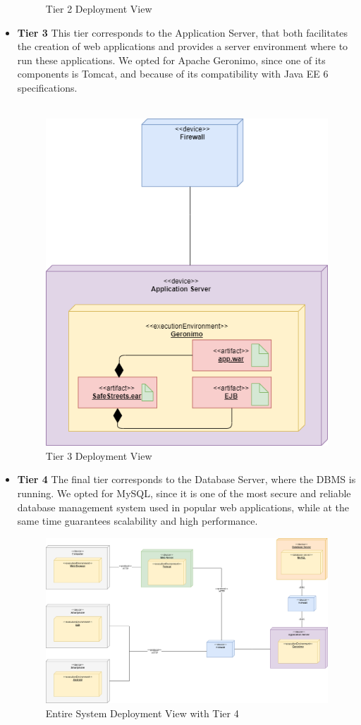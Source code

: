 \documentclass[12pt,a4paper]{article}
\begin{document}
\begin{itemize}
\begin{figure}[H]
		\caption{Tier 2 Deployment View}
	\end{figure}
\newpage
\item \textbf{Tier 3}
This tier corresponds to the Application Server, that both facilitates the creation of web applications and provides a server environment where to run these applications. We opted for Apache Geronimo, since one of its components is Tomcat, and because of its compatibility with Java EE 6 specifications.\\\\
\begin{figure}[H]
		\centering
		\includegraphics[width=0.5\linewidth]{../assets/images/app_server.png}
		\caption{Tier 3 Deployment View}
	\end{figure}
\newpage
\item \textbf{Tier 4}
The final tier corresponds to the Database Server, where the DBMS is running. We opted for MySQL, since it is one of the most secure and reliable database management system used in popular web applications, while at the same time guarantees scalability and high performance.
\begin{figure}[H]
		\centering
		\includegraphics[width=1.0\linewidth]{../assets/images/ENTIRE SYSTEM.png}
		\caption{Entire System Deployment View with Tier 4}
	\end{figure}
\end{itemize}
\end{document}
